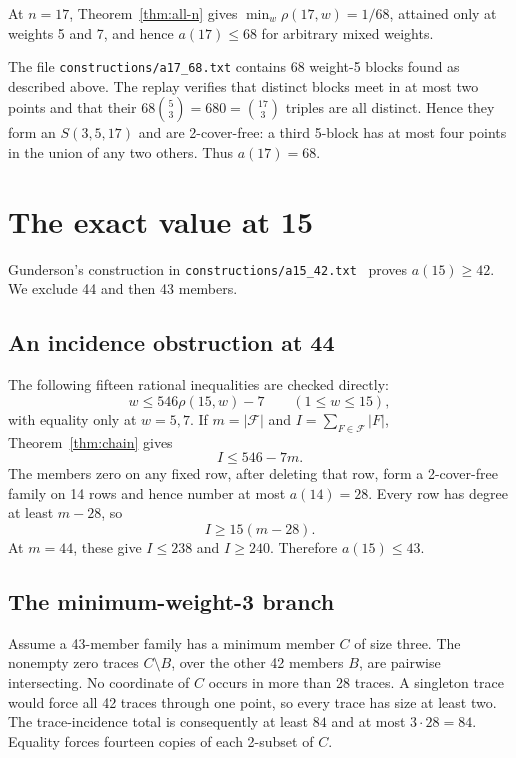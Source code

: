 \documentclass[11pt]{article}
\newcommand{\binomc}[2]{\binom{#1}{#2}}
\newcommand{\F}{\mathcal F}
\begin{document}
At $n=17$, Theorem~\ref{thm:all-n} gives
$\min_w\rho(17,w)=1/68$, attained only at weights 5 and 7, and hence
$a(17)\leq68$ for arbitrary mixed weights.

The file \texttt{constructions/a17\_68.txt} contains 68 weight-5 blocks found
as described above.
The replay verifies that distinct blocks meet in at most two points and that
their $68\binomc53=680=\binomc{17}3$ triples are all distinct.  Hence they
form an $S(3,5,17)$ and are 2-cover-free: a third 5-block has at most four
points in the union of any two others.  Thus $a(17)=68$.

\section{The exact value at 15}

Gunderson's construction in
\texttt{constructions/a15\_42.txt}~\cite{gunderson-a286874} proves
$a(15)\geq42$.
We exclude 44 and then 43 members.

\subsection{An incidence obstruction at 44}

The following fifteen rational inequalities are checked directly:
\[
 w\leq546\rho(15,w)-7\qquad(1\leq w\leq15),
\]
with equality only at $w=5,7$.  If $m=|\F|$ and
$I=\sum_{F\in\F}|F|$, Theorem~\ref{thm:chain} gives
\begin{equation}\label{eq:inc-upper}
 I\leq546-7m.
\end{equation}
The members zero on any fixed row, after deleting that row, form a
2-cover-free family on 14 rows and hence number at most $a(14)=28$.
Every row has degree at least $m-28$, so
\begin{equation}\label{eq:inc-lower}
 I\geq15(m-28).
\end{equation}
At $m=44$, these give $I\leq238$ and $I\geq240$.  Therefore $a(15)\leq43$.

\subsection{The minimum-weight-3 branch}

Assume a 43-member family has a minimum member $C$ of size three.  The
nonempty zero traces $C\setminus B$, over the other 42 members $B$, are
pairwise intersecting.  No coordinate of $C$ occurs in more than 28 traces.
A singleton trace would force all 42 traces through one point, so every trace
has size at least two.  The trace-incidence total is consequently at least
$84$ and at most $3\cdot28=84$.  Equality forces fourteen copies of each
2-subset of $C$.
\end{document}
